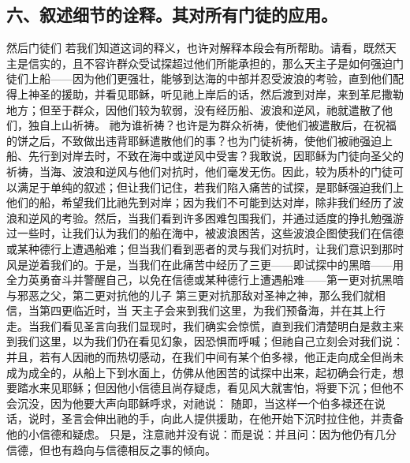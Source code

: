 
\subsection{六、叙述细节的诠释。其对所有门徒的应用。}

然后门徒们 若我们知道这词的释义，也许对解释本段会有所帮助。请看，既然天主是信实的，且不容许群众受试探超过他们所能承担的，那么天主子是如何强迫门徒们上船——因为他们更强壮，能够到达海的中部并忍受波浪的考验，直到他们配得上神圣的援助，并看见耶稣，听见祂上岸后的话，然后渡到对岸，来到革尼撒勒地方；但至于群众，因他们较为软弱，没有经历船、波浪和逆风，祂就遣散了他们，独自上山祈祷。 祂为谁祈祷？也许是为群众祈祷，使他们被遣散后，在祝福的饼之后，不致做出违背耶稣遣散他们的事？也为门徒祈祷，使他们被祂强迫上船、先行到对岸去时，不致在海中或逆风中受害？我敢说，因耶稣为门徒向圣父的祈祷，当海、波浪和逆风与他们对抗时，他们毫发无伤。因此，较为质朴的门徒可以满足于单纯的叙述；但让我们记住，若我们陷入痛苦的试探，是耶稣强迫我们上他们的船，希望我们比祂先到对岸；因为我们不可能到达对岸，除非我们经历了波浪和逆风的考验。然后，当我们看到许多困难包围我们，并通过适度的挣扎勉强游过一些时，让我们认为我们的船在海中，被波浪困苦，这些波浪企图使我们在信德或某种德行上遭遇船难；但当我们看到恶者的灵与我们对抗时，让我们意识到那时风是逆着我们的。于是，当我们在此痛苦中经历了三更——即试探中的黑暗——用全力英勇奋斗并警醒自己，以免在信德或某种德行上遭遇船难——第一更对抗黑暗与邪恶之父，第二更对抗他的儿子 第三更对抗那敌对圣神之神，那么我们就相信，当第四更临近时，当 天主子会来到我们这里，为我们预备海，并在其上行走。当我们看见圣言向我们显现时，我们确实会惊慌，直到我们清楚明白是救主来到我们这里，以为我们仍在看见幻象，因恐惧而呼喊；但祂自己立刻会对我们说： 并且，若有人因祂的而热切感动，在我们中间有某个伯多禄，他正走向成全但尚未成为成全的，从船上下到水面上，仿佛从他困苦的试探中出来，起初确会行走，想要踏水来见耶稣；但因他小信德且尚存疑虑，看见风大就害怕，将要下沉；但他不会沉没，因为他要大声向耶稣呼求，对祂说： 随即，当这样一个伯多禄还在说话，说时，圣言会伸出祂的手，向此人提供援助，在他开始下沉时拉住他，并责备他的小信德和疑虑。 只是，注意祂并没有说：而是说：并且问：因为他仍有几分信德，但也有趋向与信德相反之事的倾向。\par

